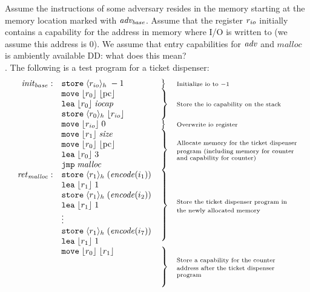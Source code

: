 \documentclass{article}
\newcommand\dominique[1]{{\color{purple} \sf \footnotesize {DD: #1}}\\}
\newcommand{\pcreg}{\mathrm{pc}}
\newcommand{\plainfun}[2]{
  \ifthenelse{\equal{#2}{}}
             {\mathit{#1}}
             {\mathit{#1}(#2)}
}
\newcommand{\encode}{\plainfun{encode}{}}
\newcommand{\codelabel}[1]{\mathit{#1}}
\newcommand{\malloc}{\codelabel{malloc}}
\newcommand{\iocap}{\codelabel{iocap}}
\newcommand{\refreg}[1]{\lfloor #1 \rfloor}
\newcommand{\refheap}[1]{\langle #1 \rangle_h}
\newcommand{\zinstr}[1]{\mathtt{#1}}
\newcommand{\oneinstr}[2]{\zinstr{#1} \; #2}
\newcommand{\jmp}[1]{\oneinstr{jmp}{#1}}
\newcommand{\twoinstr}[3]{\zinstr{#1} \; #2 \; #3}
\newcommand{\move}[2]{\twoinstr{move}{#1}{#2}}
\newcommand{\store}[2]{\twoinstr{store}{#1}{#2}}
\newcommand{\lea}[2]{\twoinstr{lea}{#1}{#2}}
\begin{document}
Assume the instructions of some adversary resides in the memory starting at the memory location marked with $\mathit{adv_{base}}$. Assume that the register $r_{io}$ initially contains a capability for the address in memory where I/O is written to (we assume this address is 0). We assume that entry capabilities for $\adv$ and $\malloc$ is ambiently available\dominique{what does this mean?}. The following is a test program for a ticket dispenser:
\[
  \begin{array}{r l l p{\mrlen}}
\initb:     & \store{\refheap{\rio}}{-1} & \bracket{1} & \annotate{1}{Initialize io to $-1$} \\
           & \move{\refreg{r_0}}{\refreg{\pcreg}} & \bracket{3} & \annotate{3}{Store the io capability on the stack} \\
           & \lea{\refreg{r_0}}{\iocap} & & \\
           & \store{\refheap{r_0}}{\refreg{\rio}} & & \\
           & \move{\refreg{\rio}}{0} & \bracket{1} & \annotate{1}{Overwrite io register} \\
           & \move{\refreg{r_1}}{\size} &  \bracket{4} & \annotate{4}{Allocate memory for the ticket dispenser program (including memory for counter and capability for counter)}\\
           & \move{\refreg{r_0}}{\refreg{\pcreg}} & & \\
           & \lea{\refreg{r_0}}{3} & & \\
           & \jmp{\malloc} & & \\
\retm:     & \store{\refheap{r_1}}{(\encode(i_1))} & \bracket{7} & \annotate{7}{Store the ticket dispenser program in the newly allocated memory} \\
           & \lea{\refreg{r_1}}{1} & & \\
           & \store{\refheap{r_1}}{(\encode(i_2))} & & \\
           & \lea{\refreg{r_1}}{1} & & \\
           & \vdots & & \\
           & \store{\refheap{r_1}}{(\encode(i_7))} & & \\
           & \lea{\refreg{r_1}}{1} & & \\
           & \move{\refreg{r_0}}{\refreg{r_1}} & \bracket{4} & \annotate{4}{Store a capability for the counter address after the ticket dispenser program} \\

\end{array}\]
\end{document}
